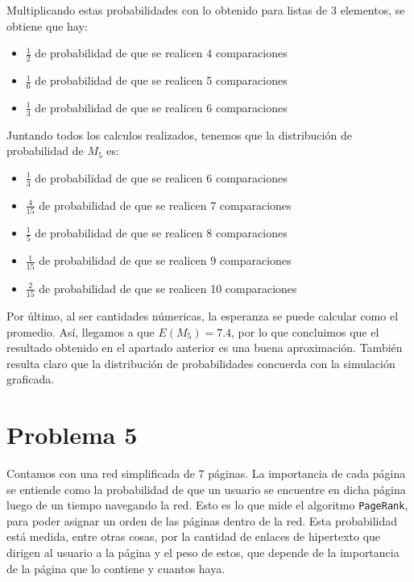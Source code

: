 \documentclass[11pt]{article}
\begin{document}
Multiplicando estas probabilidades con lo obtenido para listas de 3 elementos, se obtiene que hay:

\begin{itemize}
    \item $\frac{1}{2}$ de probabilidad de que se realicen 4 comparaciones
    \item $\frac{1}{6}$ de probabilidad de que se realicen 5 comparaciones
    \item $\frac{1}{3}$ de probabilidad de que se realicen 6 comparaciones
\end{itemize}

Juntando todos los calculos realizados, tenemos que la distribución de probabilidad de $M_5$ es:

\begin{itemize}
    \item $\frac{1}{3}$ de probabilidad de que se realicen 6 comparaciones
    \item $\frac{4}{15}$ de probabilidad de que se realicen 7 comparaciones
    \item $\frac{1}{5}$ de probabilidad de que se realicen 8 comparaciones
    \item $\frac{1}{15}$ de probabilidad de que se realicen 9 comparaciones
    \item $\frac{2}{15}$ de probabilidad de que se realicen 10 comparaciones
\end{itemize}

Por último, al ser cantidades númericas, la esperanza se puede calcular como el promedio. Así, llegamos a que $E(M_5) = 7.4$, por lo que concluimos que el resultado obtenido en el apartado anterior es una buena aproximación. También resulta claro que la distribución de probabilidades concuerda con la simulación graficada.


\section*{Problema 5}

Contamos con una red simplificada de 7 páginas. La importancia de cada página se entiende como la probabilidad de que un usuario se encuentre en dicha página luego de un tiempo navegando la red. Esto es lo que mide el algoritmo \verb|PageRank|, para poder asignar un orden de las páginas dentro de la red. Esta probabilidad está medida, entre otras cosas, por la cantidad de enlaces de hipertexto que dirigen al usuario a la página y el peso de estos, que depende de la importancia de la página que lo contiene y cuantos haya.
\end{document}
